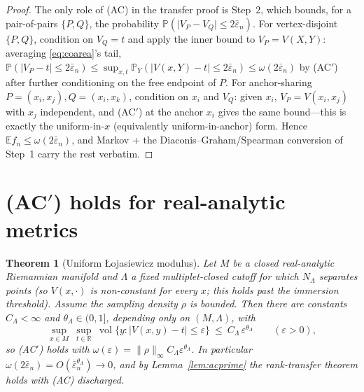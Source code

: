 \documentclass[11pt]{article}
\newtheorem{theorem}{Theorem}
\theoremstyle{remark}
\newcommand{\vol}{\operatorname{vol}}
\newcommand{\NL}{N_\Lambda}
\begin{document}
\begin{proof}
The only role of (AC) in the transfer proof is Step~2, which bounds, for a pair-of-pairs
$\{P,Q\}$, the probability $\mathbb P(\lvert V_P-V_Q\rvert\le2\bar\varepsilon_n)$. For
vertex-disjoint $\{P,Q\}$, condition on $V_Q=t$ and apply the inner bound to
$V_P=V(X,Y)$: averaging \eqref{eq:coarea}'s tail,
$\mathbb P(\lvert V_P-t\rvert\le2\bar\varepsilon_n)\le\sup_{x,t}\mathbb P_Y(\lvert V(x,Y)-t\rvert\le2\bar\varepsilon_n)\le\omega(2\bar\varepsilon_n)$
by (AC$'$) after further conditioning on the free endpoint of $P$. For anchor-sharing
$P=(x_i,x_j),Q=(x_i,x_k)$, condition on $x_i$ and $V_Q$: given $x_i$, $V_P=V(x_i,x_j)$
with $x_j$ independent, and (AC$'$) at the anchor $x_i$ gives the same bound---this is
exactly the uniform-in-$x$ (equivalently uniform-in-anchor) form. Hence
$\mathbb E f_n\le\omega(2\bar\varepsilon_n)$, and Markov + the Diaconis--Graham/Spearman
conversion of Step~1 carry the rest verbatim.
\end{proof}

\section{(AC$'$) holds for real-analytic metrics}

\begin{theorem}[Uniform \L ojasiewicz modulus]\label{thm:loja}
Let $M$ be a closed real-analytic Riemannian manifold and $\Lambda$ a fixed
multiplet-closed cutoff for which $\NL$ separates points (so $V(x,\cdot)$ is non-constant
for every $x$; this holds past the immersion threshold). Assume the sampling density
$\rho$ is bounded. Then there are constants $C_\Lambda<\infty$ and
$\theta_\Lambda\in(0,1]$, depending only on $(M,\Lambda)$, with
\[
\sup_{x\in M}\ \sup_{t\in\mathbb R}\ \vol\bigl\{y:\lvert V(x,y)-t\rvert\le\varepsilon\bigr\}\ \le\ C_\Lambda\,\varepsilon^{\theta_\Lambda}
\qquad(\varepsilon>0),
\]
so (AC$'$) holds with $\omega(\varepsilon)=\lVert\rho\rVert_\infty C_\Lambda\varepsilon^{\theta_\Lambda}$.
In particular $\omega(2\bar\varepsilon_n)=O(\bar\varepsilon_n^{\theta_\Lambda})\to0$, and
by Lemma~\ref{lem:acprime} the rank-transfer theorem holds with (AC) discharged.
\end{theorem}
\end{document}
